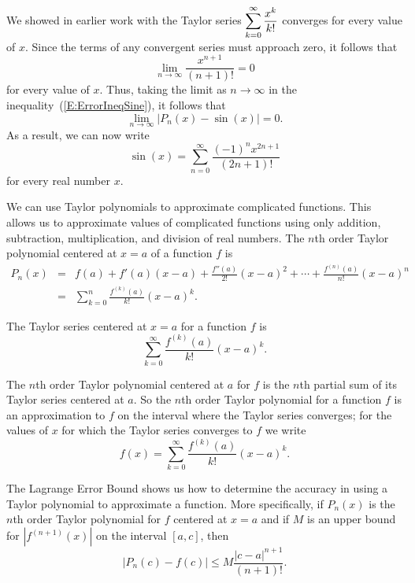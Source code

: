 We showed in earlier work with the Taylor series $\displaystyle \sum_{k=0}^{\infty} \frac{x^k}{k!}$ converges for every value of $x$.  Since the terms of any convergent series must approach zero, it follows that
\[\lim_{n \to \infty} \frac{x^{n+1}}{(n+1)!} = 0\]
for every value of $x$. Thus, taking the limit as $n \to \infty$ in the inequality~(\ref{E:ErrorIneqSine}), it follows that 
$$\lim_{n \to \infty} |P_n(x) - \sin(x)| = 0.$$ As a result, we can now write
\[\sin(x) = \sum_{n=0}^{\infty} \frac{(-1)^nx^{2n+1}}{(2n+1)!}\]
for every real number $x$.
\afterex




\begin{summary}
\item We can use Taylor polynomials to approximate complicated functions. This allows us to approximate values of complicated functions using only addition, subtraction, multiplication, and division of real numbers. The $n$th order Taylor polynomial centered at $x=a$ of a function $f$ is
    \begin{eqnarray*} P_n(x) &  = & f(a) + f'(a)(x-a) + \frac{f''(a)}{2!}(x-a)^2 + \cdots + \frac{f^{(n)}(a)}{n!}(x-a)^n \\ & = & \sum_{k=0}^n \frac{f^{(k)}(a)}{k!}(x-a)^k.
\end{eqnarray*}
\item The Taylor series centered at $x=a$ for a function $f$ is
\[\sum_{k=0}^{\infty} \frac{f^{(k)}(a)}{k!}(x-a)^k.\]
\item The $n$th order Taylor polynomial centered at $a$ for $f$ is the $n$th partial sum of its Taylor series centered at $a$. So the $n$th order Taylor polynomial for a function $f$ is an approximation to $f$ on the interval where the Taylor series converges; for the values of $x$ for which the Taylor series converges to $f$ we write
\[f(x) = \sum_{k=0}^{\infty} \frac{f^{(k)}(a)}{k!}(x-a)^k.\]
\item The Lagrange Error Bound shows us how to determine the accuracy in using a Taylor polynomial to approximate a function. More specifically, if $P_n(x)$ is the $n$th order Taylor polynomial for $f$ centered at $x=a$ and if $M$ is an upper bound for $\left|f^{(n+1)}(x)\right|$ on the interval $[a, c]$, then
    \[\left|P_n(c) - f(c)\right| \leq M\frac{|c-a|^{n+1}}{(n+1)!}.\]
\end{summary}

\nin \hrulefill



\clearpage
